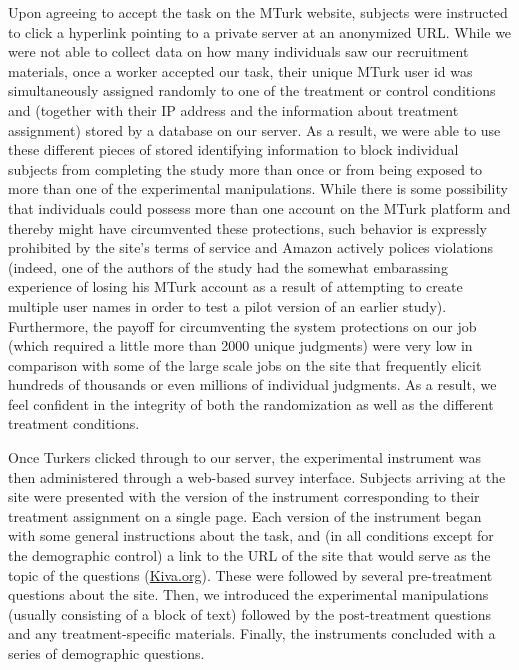 \documentclass{chi2009}
\begin{document}
{%
Upon agreeing to accept the task on the MTurk website, subjects were
instructed to click a hyperlink pointing to a private server at an
anonymized URL. While we were not able to collect data on how many
individuals saw our recruitment materials, once a worker accepted our
task, their unique MTurk user id was simultaneously assigned randomly
to one of the treatment or control conditions and (together with their
IP address and the information about treatment assignment) stored by a
database on our server. As a result, we were able to use these
different pieces of stored identifying information to block individual
subjects from completing the study more than once or from being
exposed to more than one of the experimental manipulations. While
there is some possibility that individuals could possess more than one
account on the MTurk platform and thereby might have circumvented
these protections, such behavior is expressly prohibited by the site's
terms of service and Amazon actively polices violations (indeed, one
of the authors of the study had the somewhat embarassing experience of
losing his MTurk account as a result of attempting to create multiple
user names in order to test a pilot version of an earlier
study). Furthermore, the payoff for circumventing the system
protections on our job (which required a little more than 2000 unique
judgments) were very low in comparison with some of the large scale
jobs on the site that frequently elicit hundreds of thousands or even
millions of individual judgments. As a result, we feel confident in
the integrity of both the randomization as well as the different
treatment conditions.

Once Turkers clicked through to our server, the experimental
instrument was then administered through a web-based survey
interface. Subjects arriving at the site were presented with the
version of the instrument corresponding to their treatment assignment
on a single page. Each version of the instrument began with some
general instructions about the task, and (in all conditions except for
the demographic control) a link to the URL of the site that would
serve as the topic of the questions
(\href{http://www.kiva.org}{Kiva.org}). These were followed by several
pre-treatment questions about the site. Then, we introduced the
experimental manipulations (usually consisting of a block of text)
followed by the post-treatment questions and any treatment-specific
materials. Finally, the instruments concluded with a series of
demographic questions.

}
\end{document}
